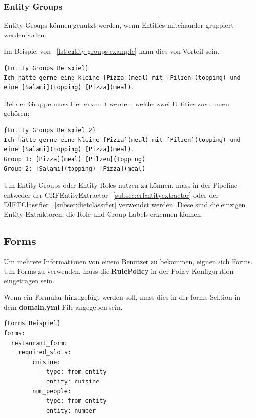 \subsubsection{Entity Groups}\label{subsubsec:entity-groups}

Entity Groups können genutzt werden, wenn Entities miteinander gruppiert werden sollen.\cite{entityRolesGroups}

Im Beispiel von ~\ref{lst:entity-groups-example} kann dies von Vorteil sein.

\begin{lstlisting}[label={lst:entity-groups-example},caption={Entity Groups Beispiel}]{Entity Groups Beispiel}
Ich hätte gerne eine kleine [Pizza](meal) mit [Pilzen](topping) und eine [Salami](topping) [Pizza](meal).
\end{lstlisting}

Bei der Gruppe muss hier erkannt werden, welche zwei Entities zusammen gehören\cite{entityRolesGroups}:

\begin{lstlisting}[label={lst:entity-groups-example-2},caption={Entity Groups Beispiel 2}]{Entity Groups Beispiel 2}
Ich hätte gerne eine kleine [Pizza](meal) mit [Pilzen](topping) und eine [Salami](topping) [Pizza](meal).
Group 1: [Pizza](meal) [Pilzen](topping)
Group 2: [Salami](topping) [Pizza](meal)
\end{lstlisting}

Um Entity Groups oder Entity Roles nutzen zu können, muss in der Pipeline entweder der CRFEntityExtractor ~\ref{subsec:crfentityextractor} oder der DIETClassifier ~\ref{subsec:dietclassifier} verwendet werden.
Diese sind die einzigen Entity Extraktoren, die Role und Group Labels erkennen können.\cite{entityRolesGroups}

\subsection{Forms}\label{subsection:forms}

Um mehrere Informationen von einem Benutzer zu bekommen, eignen sich Forms.
Um Forms zu verwenden, muss die \textbf{RulePolicy} in der Policy Konfiguration eingetragen sein.\cite{forms}

Wenn ein Formular hinzugefügt werden soll, muss dies in der forms Sektion in dem \textbf{domain.yml} File angegeben sein.

\begin{lstlisting}[label={lst:forms-example},caption={Forms Beispiel}]{Forms Beispiel}
forms:
  restaurant_form:
    required_slots:
        cuisine:
          - type: from_entity
            entity: cuisine
        num_people:
          - type: from_entity
            entity: number
\end{lstlisting}

